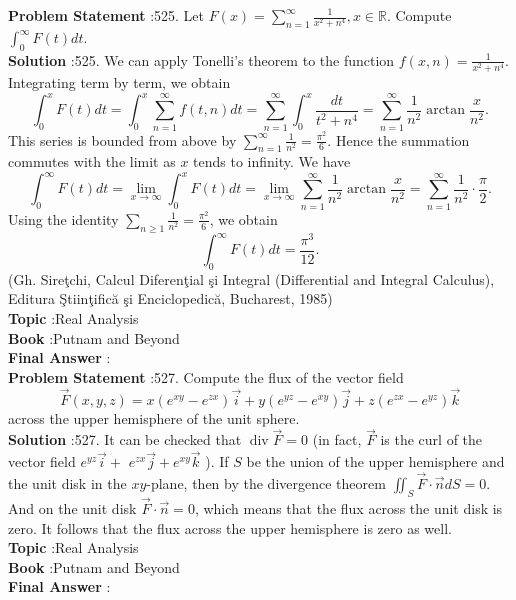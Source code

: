 \documentclass[10pt]{article}
\begin{document}
\textbf{Problem Statement} :525. Let $F(x)=\sum_{n=1}^{\infty} \frac{1}{x^{2}+n^{4}}, x \in \mathbb{R}$. Compute $\int_{0}^{\infty} F(t) d t$.\\
\textbf{Solution} :525. We can apply Tonelli's theorem to the function $f(x, n)=\frac{1}{x^{2}+n^{4}}$. Integrating term by term, we obtain$$ \int_{0}^{x} F(t) d t=\int_{0}^{x} \sum_{n=1}^{\infty} f(t, n) d t=\sum_{n=1}^{\infty} \int_{0}^{x} \frac{d t}{t^{2}+n^{4}}=\sum_{n=1}^{\infty} \frac{1}{n^{2}} \arctan \frac{x}{n^{2}} . $$This series is bounded from above by $\sum_{n=1}^{\infty} \frac{1}{n^{2}}=\frac{\pi^{2}}{6}$. Hence the summation commutes with the limit as $x$ tends to infinity. We have$$ \int_{0}^{\infty} F(t) d t=\lim _{x \rightarrow \infty} \int_{0}^{x} F(t) d t=\lim _{x \rightarrow \infty} \sum_{n=1}^{\infty} \frac{1}{n^{2}} \arctan \frac{x}{n^{2}}=\sum_{n=1}^{\infty} \frac{1}{n^{2}} \cdot \frac{\pi}{2} . $$Using the identity $\sum_{n \geq 1} \frac{1}{n^{2}}=\frac{\pi^{2}}{6}$, we obtain$$ \int_{0}^{\infty} F(t) d t=\frac{\pi^{3}}{12} . $$(Gh. Sireţchi, Calcul Diferenţial şi Integral (Differential and Integral Calculus), Editura Ştiinţifică şi Enciclopedică, Bucharest, 1985)\\
\textbf{Topic} :Real Analysis\\
\textbf{Book} :Putnam and Beyond\\
\textbf{Final Answer} :\\


\textbf{Problem Statement} :527. Compute the flux of the vector field$$ \vec{F}(x, y, z)=x\left(e^{x y}-e^{z x}\right) \vec{i}+y\left(e^{y z}-e^{x y}\right) \vec{j}+z\left(e^{z x}-e^{y z}\right) \vec{k} $$across the upper hemisphere of the unit sphere.\\
\textbf{Solution} :527. It can be checked that $\operatorname{div} \vec{F}=0$ (in fact, $\vec{F}$ is the curl of the vector field $e^{y z} \vec{i}+$ $e^{z x} \vec{j}+e^{x y} \vec{k}$ ). If $S$ be the union of the upper hemisphere and the unit disk in the $x y$-plane, then by the divergence theorem $\iint_{S} \vec{F} \cdot \vec{n} d S=0$. And on the unit disk $\vec{F} \cdot \vec{n}=0$, which means that the flux across the unit disk is zero. It follows that the flux across the upper hemisphere is zero as well.\\
\textbf{Topic} :Real Analysis\\
\textbf{Book} :Putnam and Beyond\\
\textbf{Final Answer} :\\
\end{document}
